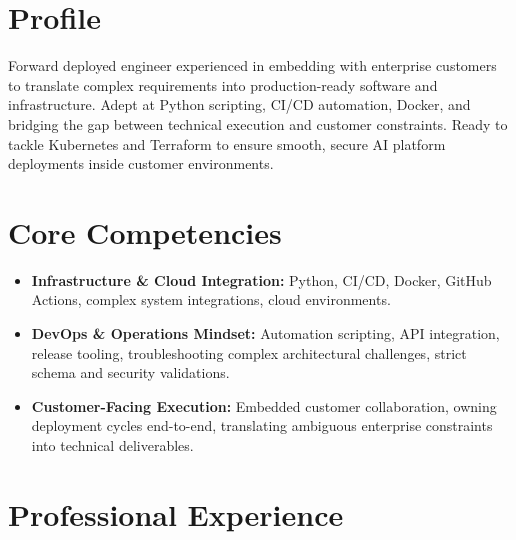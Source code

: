 \documentclass[11pt,a4paper,sans]{moderncv}
\begin{document}
\makecvtitle

\vspace{-2em}
\section{Profile}
Forward deployed engineer experienced in embedding with enterprise customers to translate complex requirements into production-ready software and infrastructure. Adept at Python scripting, CI/CD automation, Docker, and bridging the gap between technical execution and customer constraints. Ready to tackle Kubernetes and Terraform to ensure smooth, secure AI platform deployments inside customer environments.

\section{Core Competencies}
\begin{itemize}
\item \textbf{Infrastructure \& Cloud Integration:} Python, CI/CD, Docker, GitHub Actions, complex system integrations, cloud environments. 
\item \textbf{DevOps \& Operations Mindset:} Automation scripting, API integration, release tooling, troubleshooting complex architectural challenges, strict schema and security validations.
\item \textbf{Customer-Facing Execution:} Embedded customer collaboration, owning deployment cycles end-to-end, translating ambiguous enterprise constraints into technical deliverables.
\end{itemize}

\section{Professional Experience}
\vspace{1pt}
\vspace{3pt}
\end{document}
